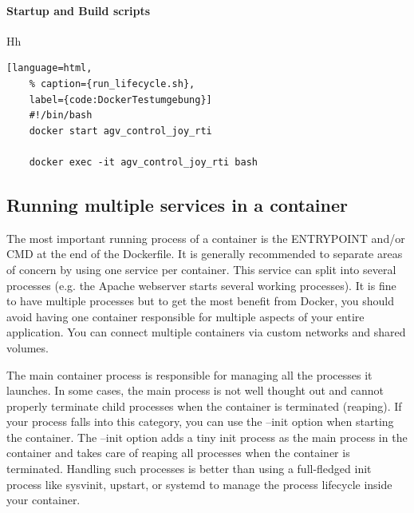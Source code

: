 \paragraph{Startup and Build scripts} Hh


\begin{lstlisting}[language=html,
	% caption={run_lifecycle.sh}, 
	label={code:DockerTestumgebung}]
	#!/bin/bash
	docker start agv_control_joy_rti

	docker exec -it agv_control_joy_rti bash 
\end{lstlisting}

\subsection{Running multiple services in a container}
The most important running process of a container is the ENTRYPOINT and/or CMD at the end of the Dockerfile. It is generally recommended to separate areas of concern by using one service per container. This service can split into several processes (e.g. the Apache webserver starts several working processes). It is fine to have multiple processes but to get the most benefit from Docker, you should avoid having one container responsible for multiple aspects of your entire application. You can connect multiple containers via custom networks and shared volumes.

The main container process is responsible for managing all the processes it launches. In some cases, the main process is not well thought out and cannot properly terminate child processes when the container is terminated (reaping). If your process falls into this category, you can use the --init option when starting the container. The --init option adds a tiny init process as the main process in the container and takes care of reaping all processes when the container is terminated. Handling such processes is better than using a full-fledged init process like sysvinit, upstart, or systemd to manage the process lifecycle inside your container.

